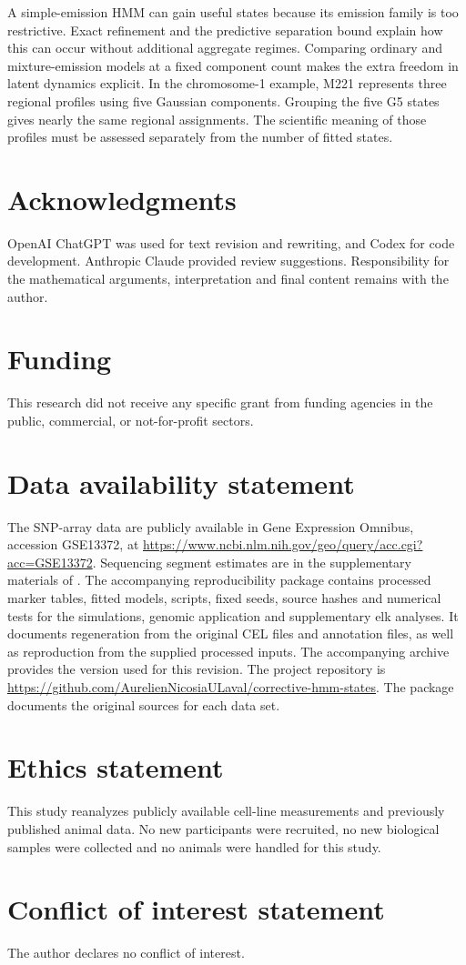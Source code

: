 \documentclass[11pt]{article}
\theoremstyle{definition}
\begin{document}
A simple-emission HMM can gain useful states because its emission family is
too restrictive. Exact refinement and the predictive separation bound
explain how this can occur without additional aggregate regimes. Comparing
ordinary and mixture-emission models at a fixed component count makes the
extra freedom in latent dynamics explicit. In the chromosome-1 example,
M221 represents three regional profiles using five Gaussian components.
Grouping the five G5 states gives nearly the same regional assignments.
The scientific meaning of
those profiles must be assessed separately from the number of fitted states.

\section*{Acknowledgments}\label{sec:acknowledgments}
OpenAI ChatGPT was used for text revision and rewriting, and Codex for code
development. Anthropic Claude provided review suggestions. Responsibility
for the mathematical arguments, interpretation and final content remains
with the author.

\section*{Funding}
This research did not receive any specific grant from funding agencies in the
public, commercial, or not-for-profit sectors.

\section*{Data availability statement}
The SNP-array data are publicly available in Gene Expression Omnibus,
accession GSE13372, at
\url{https://www.ncbi.nlm.nih.gov/geo/query/acc.cgi?acc=GSE13372}.
Sequencing segment estimates are in the supplementary materials of
\citet{ChiangEtAl2009}. The accompanying reproducibility package contains
processed marker tables, fitted models, scripts, fixed seeds, source hashes
and numerical tests for the simulations, genomic application and
supplementary elk analyses. It documents regeneration from the original CEL files
and annotation files, as well as reproduction from the supplied processed
inputs. The accompanying archive provides the version used for this
revision. The project repository is
\url{https://github.com/AurelienNicosiaULaval/corrective-hmm-states}.
The package documents the original sources for each data set.

\section*{Ethics statement}
This study reanalyzes publicly available cell-line measurements and previously
published animal data. No new participants were recruited, no new biological
samples were collected and no animals were handled for this study.

\section*{Conflict of interest statement}
The author declares no conflict of interest.

\setlength{\bibsep}{4pt plus 1pt minus 1pt}



\clearpage

\end{document}
